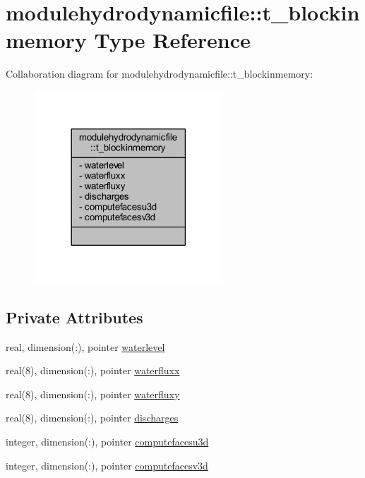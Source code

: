 \hypertarget{structmodulehydrodynamicfile_1_1t__blockinmemory}{}\section{modulehydrodynamicfile\+:\+:t\+\_\+blockinmemory Type Reference}
\label{structmodulehydrodynamicfile_1_1t__blockinmemory}


Collaboration diagram for modulehydrodynamicfile\+:\+:t\+\_\+blockinmemory\+:\nopagebreak
\begin{figure}[H]
\begin{center}
\leavevmode
\includegraphics[width=201pt]{structmodulehydrodynamicfile_1_1t__blockinmemory__coll__graph}
\end{center}
\end{figure}
\subsection*{Private Attributes}
\begin{DoxyCompactItemize}
\item 
real, dimension(\+:), pointer \mbox{\hyperlink{structmodulehydrodynamicfile_1_1t__blockinmemory_a40614ea4cab96219162f701ad1fb163d}{waterlevel}}
\item 
real(8), dimension(\+:), pointer \mbox{\hyperlink{structmodulehydrodynamicfile_1_1t__blockinmemory_a51de2da718757d9c0f9382201a6fb590}{waterfluxx}}
\item 
real(8), dimension(\+:), pointer \mbox{\hyperlink{structmodulehydrodynamicfile_1_1t__blockinmemory_afda46bd4ed0b2c0de29ba22fc0af263f}{waterfluxy}}
\item 
real(8), dimension(\+:), pointer \mbox{\hyperlink{structmodulehydrodynamicfile_1_1t__blockinmemory_a17f1d706ac09fb78dc2caf3fc75304f1}{discharges}}
\item 
integer, dimension(\+:), pointer \mbox{\hyperlink{structmodulehydrodynamicfile_1_1t__blockinmemory_aca8c62e87c49c33692d080307105f4d7}{computefacesu3d}}
\item 
integer, dimension(\+:), pointer \mbox{\hyperlink{structmodulehydrodynamicfile_1_1t__blockinmemory_a600b369fc379f9f800f4abd98651af46}{computefacesv3d}}
\end{DoxyCompactItemize}


